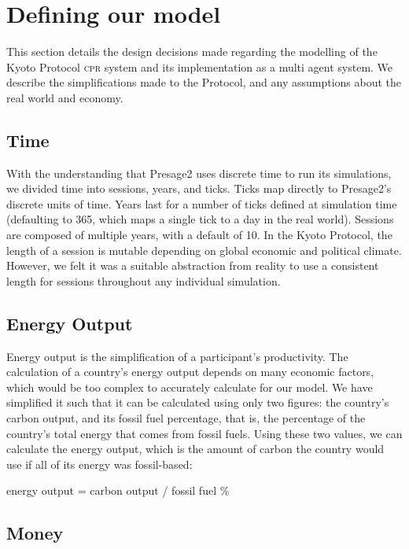 \section{Defining our model}

This section details the design decisions made regarding the modelling of the Kyoto Protocol \textsc{cpr} system and its implementation as a multi agent system. We describe the simplifications made to the Protocol, and any assumptions about the real world and economy.

\subsection{Time}

With the understanding that Presage2 uses discrete time to run its simulations, we divided time into sessions, years, and ticks. Ticks map directly to Presage2's discrete units of time. Years last for a number of ticks defined at simulation time (defaulting to 365, which maps a single tick to a day in the real world). Sessions are composed of multiple years, with a default of 10. In the Kyoto Protocol, the length of a session is mutable depending on global economic and political climate. However, we felt it was a suitable abstraction from reality to use a consistent length for sessions throughout any individual simulation.

\subsection{Energy Output}

Energy output is the simplification of a participant's productivity. The calculation of a country's energy output depends on many economic factors, which would be too complex to accurately calculate for our model. We have simplified it such that it can be calculated using only two figures: the country's carbon output, and its fossil fuel percentage, that is, the percentage of the country's total energy that comes from fossil fuels. Using these two values, we can calculate the energy output, which is the amount of carbon the country would use if all of its energy was fossil-based:

\begin{center}
energy output = carbon output / fossil fuel \%
\end{center}

\subsection{Money}

